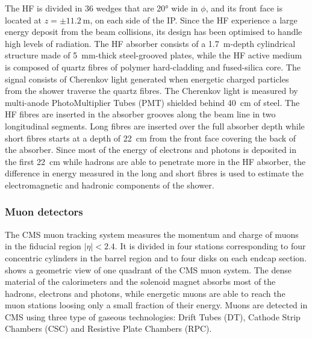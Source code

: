 The HF is divided in 36 wedges that are \ang{20} wide in $\phi$, and its front face is located at $z = {\pm}\SI{11.2}{\m}$, on each side of the IP. Since the HF experience a large energy deposit from the beam collisions, its design has been optimised to handle high levels of radiation. The HF absorber consists of a \SI{1.7}{\m}-depth cylindrical structure made of \SI{5}{\mm}-thick steel-grooved plates, while the HF active medium is composed of quartz fibres of polymer hard-cladding and fused-silica core. The signal consists of Cherenkov light generated when energetic charged particles from the shower traverse the quartz fibres. The Cherenkov light is measured by  multi-anode PhotoMultiplier Tubes (PMT) shielded behind \SI{40}{\cm} of steel. The HF fibres are inserted in the absorber grooves along the beam line in two longitudinal segments. Long fibres are inserted over the full absorber depth while short fibres starts at a depth of \SI{22}{\cm} from the front face covering the back of the absorber. Since most of the energy of electrons and photons is deposited in the first \SI{22}{\cm} while hadrons are able to penetrate more in the HF absorber, the difference in energy measured in the long and short fibres is used to estimate the electromagnetic and hadronic components of the shower.


\subsubsection{Muon detectors}\label{sec:Experiment_CMS_Subdetectors_Muon}

The CMS muon tracking system measures the momentum and charge of muons in the fiducial region $|\eta| < 2.4$. It is divided in four stations corresponding to four concentric cylinders in the barrel region and to four disks on each endcap section.  shows a geometric view of one quadrant of the CMS muon system. The dense material of the calorimeters and the solenoid magnet absorbs most of the hadrons, electrons and photons, while energetic muons are able to reach the muon stations loosing only a small fraction of their energy. Muons are detected in CMS using three type of gaseous technologies: Drift Tubes (DT), Cathode Strip Chambers (CSC) and Resistive Plate Chambers (RPC).

